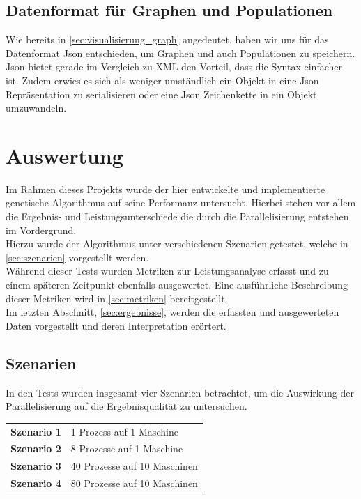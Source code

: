 \documentclass[12pt,a4paper]{scrreprt}
\begin{document}
\section{Datenformat für Graphen und Populationen}
\label{sec:datenformat}

Wie bereits in \autoref{sec:visualisierung_graph} angedeutet, haben wir uns für das Datenformat Json entschieden, um Graphen und auch Populationen zu speichern. Json bietet gerade im Vergleich zu XML den Vorteil, dass die Syntax einfacher ist. Zudem erwies es sich als weniger umständlich ein Objekt in eine Json Repräsentation zu serialisieren oder eine Json Zeichenkette in ein Objekt umzuwandeln.

\chapter{Auswertung}
\label{chap:auswertung}

Im Rahmen dieses Projekts wurde der hier entwickelte und implementierte genetische Algorithmus auf seine Performanz untersucht. Hierbei stehen vor allem die Ergebnis- und Leistungsunterschiede die durch die Parallelisierung entstehen im Vordergrund.\\
Hierzu wurde der Algorithmus unter verschiedenen Szenarien getestet, welche in \autoref{sec:szenarien} vorgestellt werden.\\
Während dieser Tests wurden Metriken zur Leistungsanalyse erfasst und zu einem späteren Zeitpunkt ebenfalls ausgewertet. Eine ausführliche Beschreibung dieser Metriken wird in \autoref{sec:metriken} bereitgestellt.\\
Im letzten Abschnitt, \autoref{sec:ergebnisse}, werden die erfassten und ausgewerteten Daten vorgestellt und deren Interpretation erörtert.

\section{Szenarien}
\label{sec:szenarien}

In den Tests wurden insgesamt vier Szenarien betrachtet, um die Auswirkung der Parallelisierung auf die Ergebnisqualität zu untersuchen.

\begin{longtable}{p{5cm} p{7cm}}
\textbf{Szenario 1} & 1 Prozess auf 1 Maschine\\
\textbf{Szenario 2} & 8 Prozesse auf 1 Maschine\\
\textbf{Szenario 3} & 40 Prozesse auf 10 Maschinen\\
\textbf{Szenario 4} & 80 Prozesse auf 10 Maschinen
\end{longtable}
\end{document}
